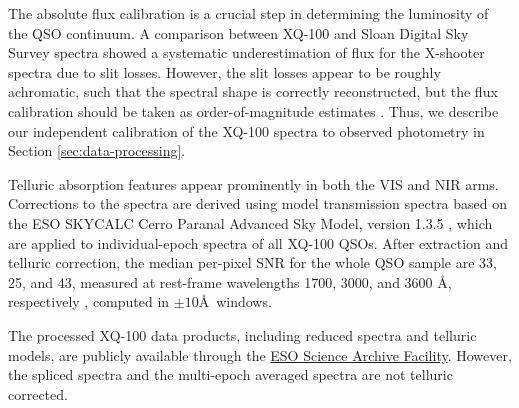 \documentclass[fleqn,usenatbib]{mnras}
\begin{document}
The absolute flux calibration is a crucial step in determining the luminosity of the QSO continuum. A comparison between XQ-100 and Sloan Digital Sky Survey \citep[SDSS;][]{York_2000_SDSS} spectra showed a systematic underestimation of flux for the X-shooter spectra due to slit losses. However, the slit losses appear to be roughly achromatic, such that the spectral shape is correctly reconstructed, but the flux calibration should be taken as order-of-magnitude estimates \citep{Lopez_2016_XQ100}. Thus, we describe our independent calibration of the XQ-100 spectra to observed photometry in Section \ref{sec:data-processing}.

Telluric absorption features appear prominently in both the VIS and NIR arms. Corrections to the spectra are derived using model transmission spectra based on the ESO SKYCALC Cerro Paranal Advanced Sky Model, version 1.3.5 \citep{Noll_2012, Jones_2013}, which are applied to individual-epoch spectra of all XQ-100 QSOs. After extraction and telluric correction, the median per-pixel SNR for the whole QSO sample are 33, 25, and 43, measured at rest-frame wavelengths 1700, 3000, and 3600 \AA, respectively \citep{Lopez_2016_XQ100}, computed in $\pm 10$\AA\ windows.

The processed XQ-100 data products, including reduced spectra and telluric models, are publicly available through the \href{http://archive.eso.org/wdb/wdb/adp/phase3_main/form?collection_name=XQ-100&release_name=DR1}{ESO Science Archive Facility}. However, the spliced spectra and the multi-epoch averaged spectra are not telluric corrected.
\end{document}
